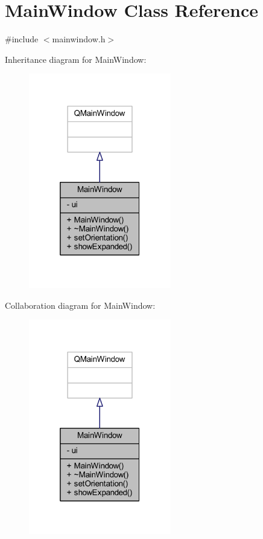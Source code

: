 \hypertarget{class_main_window}{\section{Main\-Window Class Reference}
\label{d9/dc6/class_main_window}
}


{\ttfamily \#include $<$mainwindow.\-h$>$}



Inheritance diagram for Main\-Window\-:\nopagebreak
\begin{figure}[H]
\begin{center}
\leavevmode
\includegraphics[width=176pt]{de/d4b/class_main_window__inherit__graph}
\end{center}
\end{figure}


Collaboration diagram for Main\-Window\-:\nopagebreak
\begin{figure}[H]
\begin{center}
\leavevmode
\includegraphics[width=176pt]{d0/db8/class_main_window__coll__graph}
\end{center}
\end{figure}
